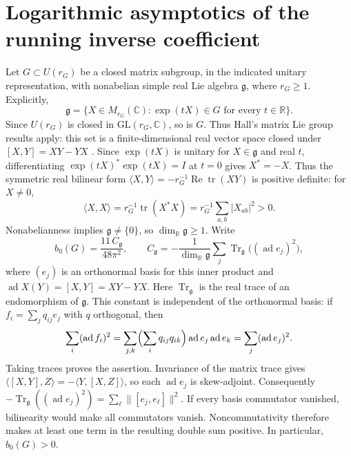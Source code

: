 \section{Logarithmic asymptotics of the running inverse coefficient}
\label{sec:running-coefficient}

Let \(G\subset U(r_G)\) be a closed matrix subgroup, in the indicated
unitary representation, with nonabelian simple real Lie algebra
\(\mathfrak g\), where \(r_G\ge1\). Explicitly,
\[
 \mathfrak g=\{X\in M_{r_G}(\mathbb C):
       \exp(tX)\in G\text{ for every }t\in\mathbb R\}.
\]
Since \(U(r_G)\) is closed in \(\mathrm{GL}(r_G,\mathbb C)\), so is \(G\).
Thus Hall's matrix Lie group results apply: this set is a finite-dimensional
real vector space closed under \([X,Y]=XY-YX\)
\cite[Definition~3.13 and Theorem~3.16]{hall2000}.
Since \(\exp(tX)\) is unitary for
\(X\in\mathfrak g\) and real \(t\), differentiating
\(\exp(tX)^*\exp(tX)=I\) at \(t=0\) gives \(X^*=-X\).
Thus the symmetric real bilinear form
\(\langle X,Y\rangle=-r_G^{-1}\operatorname{Re}\operatorname{tr}(XY)\)
is positive definite: for \(X\ne0\),
\[
 \langle X,X\rangle
 =r_G^{-1}\operatorname{tr}(X^*X)
 =r_G^{-1}\sum_{a,b}|X_{ab}|^2>0.
\]
Nonabelianness implies \(\mathfrak g\ne\{0\}\), so
\(\dim_{\mathbb R}\mathfrak g\ge1\). Write
\[
    b_0(G)=\frac{11\,C_{\mathfrak g}}{48\pi^2},
    \qquad
    C_{\mathfrak g}
      =-\frac{1}{\dim_{\mathbb R}\mathfrak g}
        \sum_j \operatorname{Tr}_{\mathfrak g}
             \bigl((\operatorname{ad}e_j)^2\bigr),
\]
where \((e_j)\) is an orthonormal basis for this inner product and
\(\operatorname{ad}X(Y)=[X,Y]=XY-YX\). Here
\(\operatorname{Tr}_{\mathfrak g}\) is the real trace of an endomorphism of
\(\mathfrak g\). This constant is independent of the orthonormal basis:
if \(f_i=\sum_j q_{ij}e_j\) with \(q\) orthogonal, then
\[
 \sum_i(\operatorname{ad}f_i)^2
 =\sum_{j,k}\Bigl(\sum_iq_{ij}q_{ik}\Bigr)
       \operatorname{ad}e_j\operatorname{ad}e_k
 =\sum_j(\operatorname{ad}e_j)^2.
\]
Taking traces proves the assertion. Invariance of the matrix trace gives
\(\langle[X,Y],Z\rangle=-\langle Y,[X,Z]\rangle\), so each
\(\operatorname{ad}e_j\) is skew-adjoint. Consequently
\(-\operatorname{Tr}_{\mathfrak g}((\operatorname{ad}e_j)^2)
=\sum_\ell\|[e_j,e_\ell]\|^2\). If every basis commutator vanished,
bilinearity would make all commutators vanish. Noncommutativity therefore
makes at least one term in the resulting double sum positive. In particular,
\(b_0(G)>0\).

